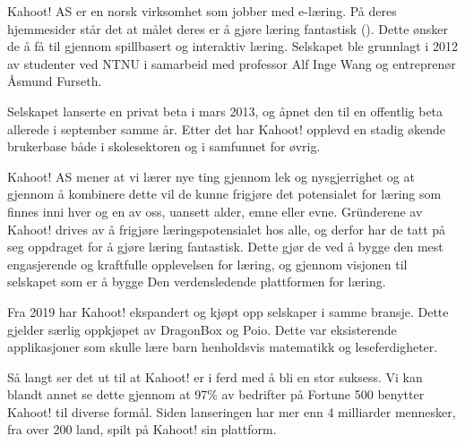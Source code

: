 Kahoot! AS er en norsk virksomhet som jobber med e-læring. På deres hjemmesider står det at målet deres er å gjøre læring fantastisk (\cite{About_Us}). Dette ønsker de å få til gjennom spillbasert og interaktiv læring. Selskapet ble grunnlagt i 2012 av studenter ved NTNU i samarbeid med professor Alf Inge Wang og entreprenør Åsmund Furseth.

Selskapet lanserte en privat beta i mars 2013, og åpnet den til en offentlig beta allerede i september samme år. Etter det har Kahoot! opplevd en stadig økende brukerbase både i skolesektoren og i samfunnet for øvrig.

Kahoot! AS mener at vi lærer nye ting gjennom lek og nysgjerrighet og at gjennom å kombinere dette vil de kunne frigjøre det potensialet for læring som finnes inni hver og en av oss, uansett alder, emne eller evne. Gründerene av Kahoot! drives av å frigjøre læringspotensialet hos alle, og derfor har de tatt på seg oppdraget for å gjøre læring fantastisk. Dette gjør de ved å bygge den mest engasjerende og kraftfulle opplevelsen for læring, og gjennom visjonen til selskapet som er å bygge Den verdensledende plattformen for læring.

Fra 2019 har Kahoot! ekspandert og kjøpt opp selskaper i samme bransje. Dette gjelder særlig oppkjøpet av DragonBox og Poio. Dette var eksisterende applikasjoner som skulle lære barn henholdsvis matematikk og leseferdigheter.


Så langt ser det ut til at Kahoot! er i ferd med å bli en stor suksess. Vi kan blandt annet se dette gjennom at 97\% av bedrifter på Fortune 500 benytter Kahoot! til diverse formål. Siden lanseringen har mer enn 4 milliarder mennesker, fra over 200 land, spilt på Kahoot! sin plattform.